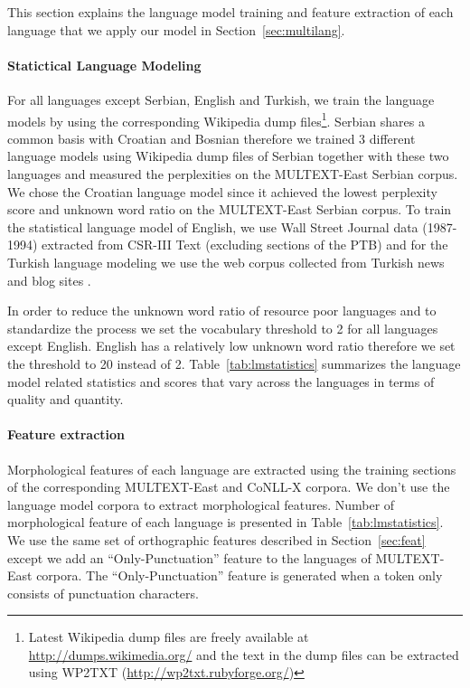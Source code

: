 This section explains the language model training and feature
extraction of each language that we apply our model in
Section~\ref{sec:multilang}.  

\paragraph{Statictical Language Modeling}For all languages except
Serbian, English and Turkish, we train the language models by using
the corresponding Wikipedia dump files\footnote{Latest Wikipedia dump
  files are freely available at \url{http://dumps.wikimedia.org/} and
  the text in the dump files can be extracted using WP2TXT
  (\url{http://wp2txt.rubyforge.org/})}.  Serbian shares a common
basis with Croatian and Bosnian therefore we trained 3 different
language models using Wikipedia dump files of Serbian together with
these two languages and measured the perplexities on the MULTEXT-East
Serbian corpus.  We chose the Croatian language model since it
achieved the lowest perplexity score and unknown word ratio on the
MULTEXT-East Serbian corpus.  To train the statistical language model
of English, we use Wall Street Journal data (1987-1994) extracted from
CSR-III Text \cite{csr3text} (excluding sections of the PTB) and for
the Turkish language modeling we use the web corpus collected from
Turkish news and blog sites \cite{sak2008turkish}.  

In order to reduce the unknown word ratio of resource poor languages
and to standardize the process we set the vocabulary threshold to 2
for all languages except English.  English has a relatively low
unknown word ratio therefore we set the threshold to 20 instead of 2.
Table~\ref{tab:lmstatistics} summarizes the language model related
statistics and scores that vary across the languages in terms of
quality and quantity.

\paragraph{Feature extraction}Morphological features of each language
are extracted using the training sections of the corresponding
MULTEXT-East and CoNLL-X corpora.  We don't use the language model
corpora to extract morphological features.  Number of morphological
feature of each language is presented in Table~\ref{tab:lmstatistics}.
We use the same set of orthographic features described in
Section~\ref{sec:feat} except we add an ``Only-Punctuation'' feature
to the languages of MULTEXT-East corpora.  The ``Only-Punctuation''
feature is generated when a token only consists of punctuation
characters.

